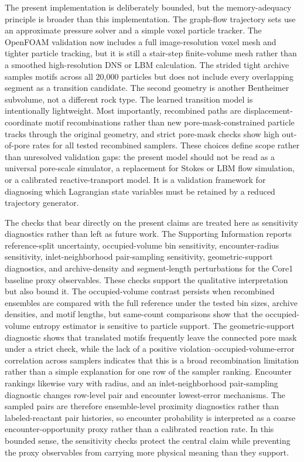 \documentclass[11pt]{article}
\begin{document}
The present implementation is deliberately bounded, but the memory-adequacy principle is broader than this implementation. The graph-flow trajectory sets use an approximate pressure solver and a simple voxel particle tracker. The OpenFOAM validation now includes a full image-resolution voxel mesh and tighter particle tracking, but it is still a stair-step finite-volume mesh rather than a smoothed high-resolution DNS or LBM calculation. The strided tight archive samples motifs across all 20,000 particles but does not include every overlapping segment as a transition candidate. The second geometry is another Bentheimer subvolume, not a different rock type. The learned transition model is intentionally lightweight. Most importantly, recombined paths are displacement-coordinate motif recombinations rather than new pore-mask-constrained particle tracks through the original geometry, and strict pore-mask checks show high out-of-pore rates for all tested recombined samplers. These choices define scope rather than unresolved validation gaps: the present model should not be read as a universal pore-scale simulator, a replacement for Stokes or LBM flow simulation, or a calibrated reactive-transport model. It is a validation framework for diagnosing which Lagrangian state variables must be retained by a reduced trajectory generator.

The checks that bear directly on the present claims are treated here as sensitivity diagnostics rather than left as future work. The Supporting Information reports reference-split uncertainty, occupied-volume bin sensitivity, encounter-radius sensitivity, inlet-neighborhood pair-sampling sensitivity, geometric-support diagnostics, and archive-density and segment-length perturbations for the Core1 baseline proxy observables. These checks support the qualitative interpretation but also bound it. The occupied-volume contrast persists when recombined ensembles are compared with the full reference under the tested bin sizes, archive densities, and motif lengths, but same-count comparisons show that the occupied-volume entropy estimator is sensitive to particle support. The geometric-support diagnostic shows that translated motifs frequently leave the connected pore mask under a strict check, while the lack of a positive violation--occupied-volume-error correlation across samplers indicates that this is a broad recombination limitation rather than a simple explanation for one row of the sampler ranking. Encounter rankings likewise vary with radius, and an inlet-neighborhood pair-sampling diagnostic changes row-level pair and encounter lowest-error mechanisms. The sampled pairs are therefore ensemble-level proximity diagnostics rather than labeled-reactant pair histories, so encounter probability is interpreted as a coarse encounter-opportunity proxy rather than a calibrated reaction rate. In this bounded sense, the sensitivity checks protect the central claim while preventing the proxy observables from carrying more physical meaning than they support.
\end{document}
